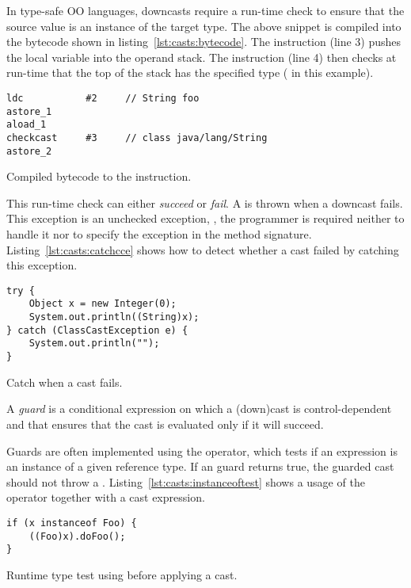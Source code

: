 In type-safe OO languages, downcasts require
a run-time check to ensure that the source value is an instance of the target type.
The above snippet is compiled into the \java{} bytecode shown in listing~\ref{lst:casts:bytecode}.
The  instruction (line 3) pushes the local variable  into the operand stack.
The  instruction (line 4) then checks at run-time that the top of the stack has the specified type ( in this example).

\begin{listing}
\begin{verbatim}	
ldc           #2     // String foo
astore_1
aload_1
checkcast     #3     // class java/lang/String
astore_2
\end{verbatim}	
\caption{Compiled bytecode to the  instruction.}
\label{lst:casts:bytecode}
\end{listing}

This run-time check can either \emph{succeed} or \emph{fail}.
A  is thrown when a downcast fails.
This exception is an unchecked exception, \ie,
the programmer is required neither to handle it
nor to specify the exception in the method signature.
Listing~\ref{lst:casts:catchcce} shows how to detect whether a cast failed by catching this exception.

\begin{listing}
\begin{verbatim}	
try {
	Object x = new Integer(0);
	System.out.println((String)x); 
} catch (ClassCastException e) { 
	System.out.println(""); 
}
\end{verbatim}
\caption{Catch  when a cast fails.}
\label{lst:casts:catchcce}
\end{listing}

A \emph{guard} is a conditional expression on which a (down)cast is control-dependent and that ensures that the cast is evaluated only if it will succeed.

Guards are often implemented using the  operator, which tests
if an expression is an instance of a given reference type.
If an  guard returns true, the guarded cast should not throw
a .
Listing~\ref{lst:casts:instanceoftest} shows a usage of the  operator together with a cast expression.

\begin{listing}
\begin{verbatim}
if (x instanceof Foo) {
	((Foo)x).doFoo();
}
\end{verbatim}
\caption{Runtime type test using  before applying a cast.}
\label{lst:casts:instanceoftest}
\end{listing}

